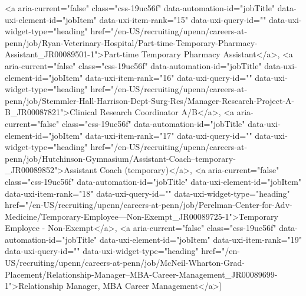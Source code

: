 <a aria-current="false" class="css-19uc56f" data-automation-id="jobTitle" data-uxi-element-id="jobItem" data-uxi-item-rank="15" data-uxi-query-id="" data-uxi-widget-type="heading" href="/en-US/recruiting/upenn/careers-at-penn/job/Ryan-Veterinary-Hospital/Part-time-Temporary-Pharmacy-Assistant_JR00089501-1">Part-time Temporary Pharmacy Assistant</a>, 
<a aria-current="false" class="css-19uc56f" data-automation-id="jobTitle" data-uxi-element-id="jobItem" data-uxi-item-rank="16" data-uxi-query-id="" data-uxi-widget-type="heading" href="/en-US/recruiting/upenn/careers-at-penn/job/Stemmler-Hall-Harrison-Dept-Surg-Res/Manager-Research-Project-A-B_JR00087821">Clinical Research Coordinator A/B</a>, <a aria-current="false" class="css-19uc56f" data-automation-id="jobTitle" data-uxi-element-id="jobItem" data-uxi-item-rank="17" data-uxi-query-id="" data-uxi-widget-type="heading" href="/en-US/recruiting/upenn/careers-at-penn/job/Hutchinson-Gymnasium/Assistant-Coach--temporary-_JR00089852">Assistant Coach (temporary)</a>, 
<a aria-current="false" class="css-19uc56f" data-automation-id="jobTitle" data-uxi-element-id="jobItem" data-uxi-item-rank="18" data-uxi-query-id="" data-uxi-widget-type="heading" href="/en-US/recruiting/upenn/careers-at-penn/job/Perelman-Center-for-Adv-Medicine/Temporary-Employee---Non-Exempt_JR00089725-1">Temporary Employee - Non-Exempt</a>, 
<a aria-current="false" class="css-19uc56f" data-automation-id="jobTitle" data-uxi-element-id="jobItem" data-uxi-item-rank="19" data-uxi-query-id="" data-uxi-widget-type="heading" href="/en-US/recruiting/upenn/careers-at-penn/job/McNeil-Wharton-Grad-Placement/Relationship-Manager--MBA-Career-Management_JR00089699-1">Relationship Manager, MBA Career Management</a>]